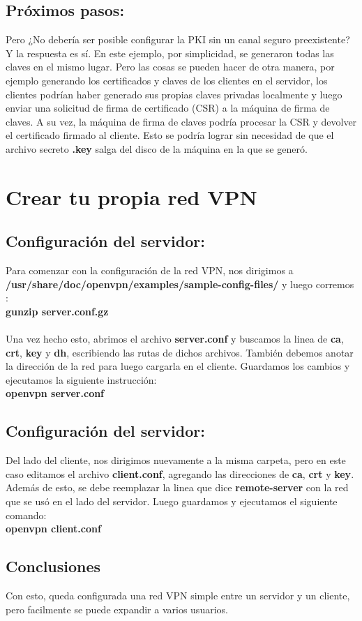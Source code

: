 \documentclass[a4paper, 12pt, usenames]{article}
\newcommand\tab[1][1cm]{\hspace*{#1}}
\begin{document}
\subsection{Próximos pasos:}
Pero ¿No debería ser posible configurar la PKI sin un canal seguro preexistente? Y la respuesta es sí. En este ejemplo, por simplicidad, se generaron todas las claves en el mismo lugar. Pero las cosas se pueden hacer de otra manera, por ejemplo generando los certificados y claves de los clientes en el servidor, los clientes podrían haber generado sus propias claves privadas localmente y luego enviar una solicitud de firma de certificado (CSR) a la máquina de firma de claves. A su vez, la máquina de firma de claves podría procesar la CSR y devolver el certificado firmado al cliente. Esto se podría lograr sin necesidad de que el archivo secreto \textbf{.key} salga del disco de la máquina en la que se generó. \\

\newpage
\section{Crear tu propia red VPN}
\subsection{Configuración del servidor:}
Para comenzar con la configuración de la red VPN, nos dirigimos a 
\textbf{/usr/share/doc/openvpn/examples/sample-config-files/}
y luego corremos : \\
\tab \textbf{gunzip server.conf.gz\\ \\}
Una vez hecho esto, abrimos el archivo \textbf{server.conf} y buscamos la linea de \textbf{ca}, \textbf{crt}, \textbf{key} y \textbf{dh}, escribiendo las rutas de dichos archivos. También debemos anotar la dirección de la red para luego cargarla en el cliente. Guardamos los cambios y ejecutamos la siguiente instrucción: \\
\tab \textbf{openvpn server.conf}\\ 

\subsection{Configuración del servidor:}
Del lado del cliente, nos dirigimos nuevamente a la misma carpeta, pero en este caso editamos el archivo \textbf{client.conf}, agregando las direcciones de \textbf{ca}, \textbf{crt} y \textbf{key}. Además de esto, se debe reemplazar la linea que dice \textbf{remote-server} con la red que se usó en el lado del servidor. Luego guardamos y ejecutamos el siguiente comando:\\
\tab \textbf{openvpn client.conf}

\subsection{Conclusiones}
Con esto, queda configurada una red VPN simple entre un servidor y un cliente, pero facilmente se puede expandir a varios usuarios.
\end{document}

